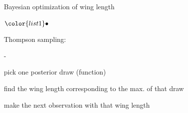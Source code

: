 \documentclass[t]{beamer}
\newenvironment{list1}{
   \begin{list}{$\color{list1}\bullet$}{\itemsep=6pt}}{
  \end{list}}
\newenvironment{list2}{
  \begin{list}{-}{\baselineskip=12pt\itemsep=2pt}}{
  \end{list}}
\begin{document}
\begin{frame}{Bayesian optimization of wing length}

{\vspace{-2\baselineskip}}
\begin{list1}
  \item<4-> Thompson sampling:
    \begin{list2}
    \item pick one posterior draw (function)
    \item find the wing length corresponding to the max. of that draw
    \item make the next observation with that wing length
    \end{list2}
  \end{list1}
  
\end{frame}
\end{document}
